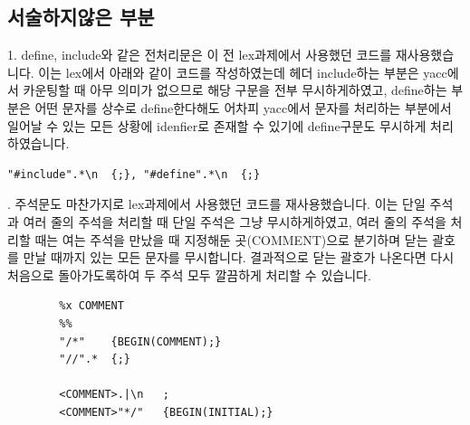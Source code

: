 \documentclass{article}
\begin{document}
    \subsection{서술하지않은 부분}
        1. define, include와 같은 전처리문은 이 전 lex과제에서 사용했던 코드를 재사용했습니다.
        이는 lex에서 아래와 같이 코드를 작성하였는데 헤더 include하는 부분은 yacc에서 카운팅할 때 아무 의미가 없으므로 해당 구문을 전부 무시하게하였고,
        define하는 부분은 어떤 문자를 상수로 define한다해도 어차피 yacc에서 문자를 처리하는 부분에서 일어날 수 있는 모든 상황에 idenfier로 존재할 수 있기에
        define구문도 무시하게 처리하였습니다. 
        \begin{verbatim}"#include".*\n	{;}, "#define".*\n	{;}\end{verbatim} 
        . 주석문도 마찬가지로 lex과제에서 사용했던 코드를 재사용했습니다. 
        이는 단일 주석과 여러 줄의 주석을 처리할 때 단일 주석은 그냥 무시하게하였고, 여러 줄의 주석을 처리할 때는 여는 주석을 만났을 때 
        지정해둔 곳(COMMENT)으로 분기하며 닫는 괄호를 만날 때까지 있는 모든 문자를 무시합니다. 결과적으로 닫는 괄호가 나온다면 다시 처음으로 돌아가도록하여 두 주석 모두 깔끔하게 처리할 수 있습니다.   
        \begin{verbatim}
        %x COMMENT
        %%
        "/*"	{BEGIN(COMMENT);} 
        "//".*	{;} 
        
        <COMMENT>.|\n	;
        <COMMENT>"*/"	{BEGIN(INITIAL);}
        \end{verbatim}
\end{document}
